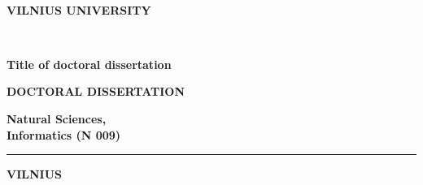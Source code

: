 \thispagestyle{empty}                   %
{\selectfont
\renewcommand\bfdefault{bc}%
\selectfont

\begin{flushright}
\thesisDOI \\ %
\thesisORCID
\end{flushright}
\begin{center}

	\vspace*{5mm}	
	\begin{flushleft}
\renewcommand\bfdefault{bc}
\bf \large
	VILNIUS UNIVERSITY \\
	\end{flushleft}
	
	
	\vspace{50mm}
	\begin{flushleft}
	{\Large \bf  \thesisAuthorName  \\ \MakeUppercase{\thesisAuthorSurname} \par}
    \end{flushleft}

	\vspace{10mm}
	\begin{flushleft}
	{\huge \bf
\fontsize{21}{21}\selectfont
	Title of doctoral dissertation \par
	}
    \end{flushleft}

    \vspace{5mm}
\begin{flushleft}
\renewcommand\bfdefault{b}
  {\bf DOCTORAL DISSERTATION}\\%
\end{flushleft}
  \vspace{15mm}
  \begin{flushleft}
\renewcommand\bfdefault{bc}
\bf
  Natural Sciences, \\ %
  Informatics (N 009)  %
  \end{flushleft}
     \begin{flushleft} 
  		\noindent\rule{3cm}{0.4pt}
     \end{flushleft} 
   \begin{flushleft} \bf
  VILNIUS \thesisYear
   \end{flushleft} 
\end{center}
}
\newpage
\thispagestyle{empty}                   %

